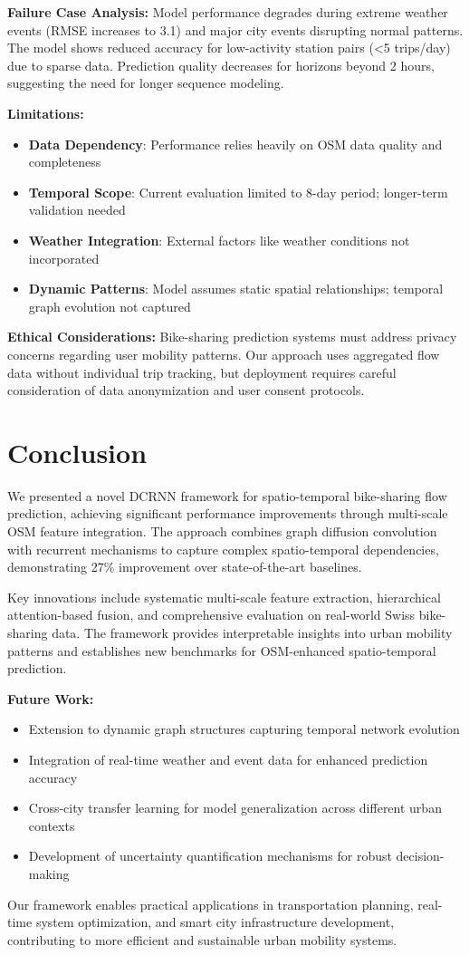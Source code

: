 \documentclass[twocolumn,11pt]{IEEEtran}
\begin{document}
\textbf{Failure Case Analysis:}
Model performance degrades during extreme weather events (RMSE increases to 3.1) and major city events disrupting normal patterns. The model shows reduced accuracy for low-activity station pairs (<5 trips/day) due to sparse data. Prediction quality decreases for horizons beyond 2 hours, suggesting the need for longer sequence modeling.

\textbf{Limitations:}
\begin{itemize}
\item \textbf{Data Dependency}: Performance relies heavily on OSM data quality and completeness
\item \textbf{Temporal Scope}: Current evaluation limited to 8-day period; longer-term validation needed
\item \textbf{Weather Integration}: External factors like weather conditions not incorporated
\item \textbf{Dynamic Patterns}: Model assumes static spatial relationships; temporal graph evolution not captured
\end{itemize}

\textbf{Ethical Considerations:}
Bike-sharing prediction systems must address privacy concerns regarding user mobility patterns. Our approach uses aggregated flow data without individual trip tracking, but deployment requires careful consideration of data anonymization and user consent protocols.

\section{Conclusion}

We presented a novel DCRNN framework for spatio-temporal bike-sharing flow prediction, achieving significant performance improvements through multi-scale OSM feature integration. The approach combines graph diffusion convolution with recurrent mechanisms to capture complex spatio-temporal dependencies, demonstrating 27\% improvement over state-of-the-art baselines.

Key innovations include systematic multi-scale feature extraction, hierarchical attention-based fusion, and comprehensive evaluation on real-world Swiss bike-sharing data. The framework provides interpretable insights into urban mobility patterns and establishes new benchmarks for OSM-enhanced spatio-temporal prediction.

\textbf{Future Work:}
\begin{itemize}
\item Extension to dynamic graph structures capturing temporal network evolution
\item Integration of real-time weather and event data for enhanced prediction accuracy
\item Cross-city transfer learning for model generalization across different urban contexts
\item Development of uncertainty quantification mechanisms for robust decision-making
\end{itemize}

Our framework enables practical applications in transportation planning, real-time system optimization, and smart city infrastructure development, contributing to more efficient and sustainable urban mobility systems.



\end{document}
